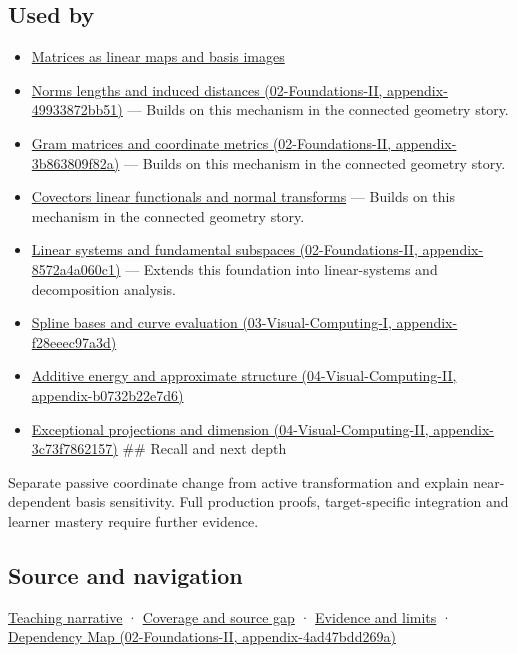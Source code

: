 \subsection{Used by}\label{appendix-ce0341f7ea0d-used-by}

\begin{itemize}
\item
  \hyperref[appendix-bd39c3bf5d64]{Matrices as linear maps and basis images}
\item
  \href{../02-Foundations-II/main.pdf\#nameddest=appendix-49933872bb51}{Norms lengths and induced distances (02-Foundations-II, appendix-49933872bb51)} --- Builds on this mechanism in the connected geometry story.
\item
  \href{../02-Foundations-II/main.pdf\#nameddest=appendix-3b863809f82a}{Gram matrices and coordinate metrics (02-Foundations-II, appendix-3b863809f82a)} --- Builds on this mechanism in the connected geometry story.
\item
  \hyperref[appendix-46da295c6787]{Covectors linear functionals and normal transforms} --- Builds on this mechanism in the connected geometry story.
\item
  \href{../02-Foundations-II/main.pdf\#nameddest=appendix-8572a4a060c1}{Linear systems and fundamental subspaces (02-Foundations-II, appendix-8572a4a060c1)} --- Extends this foundation into linear-systems and decomposition analysis.
\item
  \href{../03-Visual-Computing-I/main.pdf\#nameddest=appendix-f28eeec97a3d}{Spline bases and curve evaluation (03-Visual-Computing-I, appendix-f28eeec97a3d)}
\item
  \href{../04-Visual-Computing-II/main.pdf\#nameddest=appendix-b0732b22e7d6}{Additive energy and approximate structure (04-Visual-Computing-II, appendix-b0732b22e7d6)}
\item
  \href{../04-Visual-Computing-II/main.pdf\#nameddest=appendix-3c73f7862157}{Exceptional projections and dimension (04-Visual-Computing-II, appendix-3c73f7862157)} \#\# Recall and next depth
\end{itemize}

Separate passive coordinate change from active transformation and explain near-dependent basis sensitivity. Full production proofs, target-specific integration and learner mastery require further evidence.

\subsection{Source and navigation}\label{appendix-ce0341f7ea0d-source-and-navigation}

\hyperref[01-foundations-i-ch017-a-basis-is-a-measuring-arrangement-not-the-vector-itself]{Teaching narrative} · \hyperref[appendix-fd090d982a15-phase-6---parts-501-600]{Coverage and source gap} · \hyperref[appendix-a103e7846d21-phase-6---source-analysis-and-verification]{Evidence and limits} · \href{../02-Foundations-II/main.pdf\#nameddest=appendix-4ad47bdd269a}{Dependency Map (02-Foundations-II, appendix-4ad47bdd269a)}
